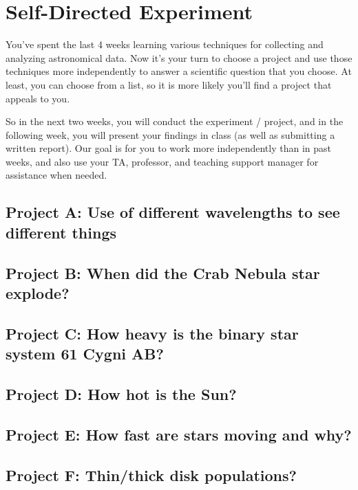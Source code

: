 \chapter{Self-Directed Experiment}

You've spent the last 4 weeks learning various techniques for collecting and analyzing astronomical data. Now it's your turn to choose a project and use those techniques more independently to answer a scientific question that you choose. At least, you can choose from a list, so it is more likely you'll find a project that appeals to you.

So in the next two weeks, you will conduct the experiment / project, and in the following week, you will present your findings in class (as well as submitting a written report). Our goal is for you to work more independently than in past weeks, and also use your TA, professor, and teaching support manager for assistance when needed.

\section{Project A: Use of different wavelengths to see different things}

\section{Project B: When did the Crab Nebula star explode?}

\section{Project C: How heavy is the binary star system 61 Cygni AB?}

\section{Project D: How hot is the Sun?}

\section{Project E: How fast are stars moving and why?}

\section{Project F: Thin/thick disk populations?}